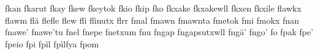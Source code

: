 \documentclass[a4paper]{article}
\begin{document}
fkan\hspace{2mm}
fkarut\hspace{2mm}
fkay\hspace{2mm}
fkew\hspace{2mm}
fkeytok\hspace{2mm}
fkio\hspace{2mm}
fkip\hspace{2mm}
fko\hspace{2mm}
fkxake\hspace{2mm}
fkxakewll\hspace{2mm}
fkxen\hspace{2mm}
fkxile\hspace{2mm}
flawkx\hspace{2mm}
flawm\hspace{2mm}
flä\hspace{2mm}
flefle\hspace{2mm}
flew\hspace{2mm}
flì\hspace{2mm}
flìnutx\hspace{2mm}
flrr\hspace{2mm}
fmal\hspace{2mm}
fmawn\hspace{2mm}
fmawnta\hspace{2mm}
fmetok\hspace{2mm}
fmi\hspace{2mm}
fmokx\hspace{2mm}
fnan\hspace{2mm}
fnawe'\hspace{2mm}
fnawe'tu\hspace{2mm}
fnel\hspace{2mm}
fnepe\hspace{2mm}
fnetxum\hspace{2mm}
fnu\hspace{2mm}
fngap\hspace{2mm}
fngapsutxwll\hspace{2mm}
fngä'\hspace{2mm}
fngo'\hspace{2mm}
fo\hspace{2mm}
fpak\hspace{2mm}
fpe'\hspace{2mm}
fpeio\hspace{2mm}
fpi\hspace{2mm}
fpìl\hspace{2mm}
fpìlfya\hspace{2mm}
fpom\hspace{2mm}
\end{document}
